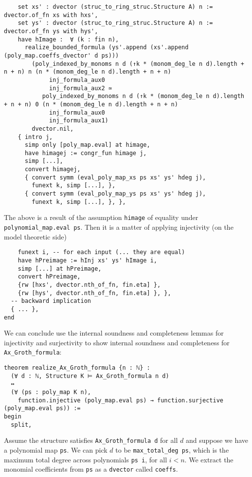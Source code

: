 \begin{lstlisting}
    set xs' : dvector (struc_to_ring_struc.Structure A) n := dvector.of_fn xs with hxs',
    set ys' : dvector (struc_to_ring_struc.Structure A) n := dvector.of_fn ys with hys',
    have hImage :  ∀ (k : fin n),
      realize_bounded_formula (ys'.append (xs'.append (poly_map.coeffs_dvector' d ps)))
        (poly_indexed_by_monoms n d (↑k * (monom_deg_le n d).length + n + n) n (n * (monom_deg_le n d).length + n + n)
             inj_formula_aux0
             inj_formula_aux2 ≃
           poly_indexed_by_monoms n d (↑k * (monom_deg_le n d).length + n + n) 0 (n * (monom_deg_le n d).length + n + n)
             inj_formula_aux0
             inj_formula_aux1)
        dvector.nil,
    { intro j,
      simp only [poly_map.eval] at himage,
      have himagej := congr_fun himage j,
      simp [...],
      convert himagej,
      { convert symm (eval_poly_map_xs ps xs' ys' hdeg j),
        funext k, simp [...], },
      { convert symm (eval_poly_map_ys ps xs' ys' hdeg j),
        funext k, simp [...], }, }, \end{lstlisting}

The above is a result of the assumption \texttt{himage} of equality
under \texttt{polynomial\_map.eval ps}.
Then it is a matter of applying injectivity (on the model theoretic side)

\begin{lstlisting}
    funext i, -- for each input (... they are equal)
    have hPreimage := hInj xs' ys' hImage i,
    simp [...] at hPreimage,
    convert hPreimage,
    {rw [hxs', dvector.nth_of_fn, fin.eta] },
    {rw [hys', dvector.nth_of_fn, fin.eta] }, },
  -- backward implication
  { ... },
end \end{lstlisting}

We can conclude use the internal soundness and completeness lemmas for
injectivity and surjectivity to show internal soundness and completeness
for \texttt{Ax\_Groth\_formula}:

\begin{lstlisting}
theorem realize_Ax_Groth_formula {n : ℕ} :
  (∀ d : ℕ, Structure K ⊨ Ax_Groth_formula n d)
  ↔
  (∀ (ps : poly_map K n),
    function.injective (poly_map.eval ps) → function.surjective (poly_map.eval ps)) :=
begin
  split,   \end{lstlisting}

Assume the structure satisfies \texttt{Ax\_Groth\_formula d} for all $d$ and
suppose we have a polynomial map \texttt{ps}.
We can pick $d$ to be \texttt{max\_total\_deg ps},
which is the maximum total degree across polynomials \texttt{ps i},
for all $i < n$.
We extract the monomial coefficients from \texttt{ps} as a \texttt{dvector}
called \texttt{coeffs}.

